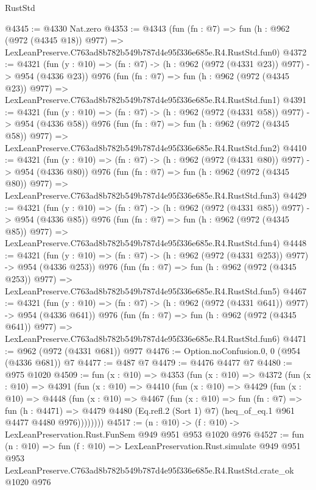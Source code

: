\begin{lexlean}{RustStd}
\begin{coremodule}
@4345 := @4330 Nat.zero
@4353 := @4343
    (fun (fn : @7) =>
    fun (h : @962 (@972 (@4345 @18)) @977) =>
    LexLeanPreserve.C763ad8b782b549b787d4e95f336e685e.R4.RustStd.fun0)
@4372 := @4321
    (fun (y : @10) => (fn : @7) -> (h : @962 (@972 (@4331 @23)) @977) -> @954 (@4336 @23))
    @976
    (fun (fn : @7) =>
    fun (h : @962 (@972 (@4345 @23)) @977) =>
    LexLeanPreserve.C763ad8b782b549b787d4e95f336e685e.R4.RustStd.fun1)
@4391 := @4321
    (fun (y : @10) => (fn : @7) -> (h : @962 (@972 (@4331 @58)) @977) -> @954 (@4336 @58))
    @976
    (fun (fn : @7) =>
    fun (h : @962 (@972 (@4345 @58)) @977) =>
    LexLeanPreserve.C763ad8b782b549b787d4e95f336e685e.R4.RustStd.fun2)
@4410 := @4321
    (fun (y : @10) => (fn : @7) -> (h : @962 (@972 (@4331 @80)) @977) -> @954 (@4336 @80))
    @976
    (fun (fn : @7) =>
    fun (h : @962 (@972 (@4345 @80)) @977) =>
    LexLeanPreserve.C763ad8b782b549b787d4e95f336e685e.R4.RustStd.fun3)
@4429 := @4321
    (fun (y : @10) => (fn : @7) -> (h : @962 (@972 (@4331 @85)) @977) -> @954 (@4336 @85))
    @976
    (fun (fn : @7) =>
    fun (h : @962 (@972 (@4345 @85)) @977) =>
    LexLeanPreserve.C763ad8b782b549b787d4e95f336e685e.R4.RustStd.fun4)
@4448 := @4321
    (fun (y : @10) => (fn : @7) -> (h : @962 (@972 (@4331 @253)) @977) -> @954 (@4336 @253))
    @976
    (fun (fn : @7) =>
    fun (h : @962 (@972 (@4345 @253)) @977) =>
    LexLeanPreserve.C763ad8b782b549b787d4e95f336e685e.R4.RustStd.fun5)
@4467 := @4321
    (fun (y : @10) => (fn : @7) -> (h : @962 (@972 (@4331 @641)) @977) -> @954 (@4336 @641))
    @976
    (fun (fn : @7) =>
    fun (h : @962 (@972 (@4345 @641)) @977) =>
    LexLeanPreserve.C763ad8b782b549b787d4e95f336e685e.R4.RustStd.fun6)
@4471 := @962 (@972 (@4331 @681)) @977
@4476 := Option.noConfusion.{0, 0} (@954 (@4336 @681)) @7
@4477 := @487 @7
@4479 := @4476 @4477 @7
@4480 := @975 @1020
@4509 := fun (x : @10) =>
  @4353
    (fun (x : @10) =>
    @4372
      (fun (x : @10) =>
      @4391
        (fun (x : @10) =>
        @4410
          (fun (x : @10) =>
          @4429
            (fun (x : @10) =>
            @4448
              (fun (x : @10) =>
              @4467
                (fun (x : @10) =>
                fun (fn : @7) =>
                fun (h : @4471) =>
                @4479 @4480 (Eq.refl.{2} (Sort 1) @7) (heq_of_eq.{1} @961 @4477 @4480 @976))))))))
@4517 := (n : @10) -> (f : @10) -> LexLeanPreservation.Rust.FunSem @949 @951 @953 @1020 @976
@4527 := fun (n : @10) =>
  fun (f : @10) =>
  LexLeanPreservation.Rust.simulate
    @949
    @951
    @953
    LexLeanPreserve.C763ad8b782b549b787d4e95f336e685e.R4.RustStd.crate_ok
    @1020
    @976
\end{coremodule}
\end{lexlean}
